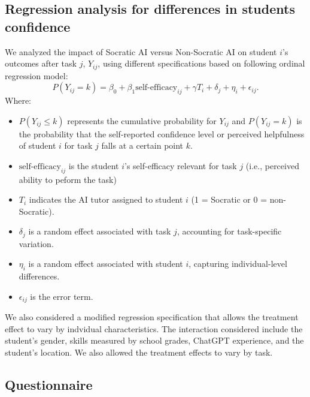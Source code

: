 \documentclass[
  11pt,
]{article}
\begin{document}
\subsection{Regression analysis for differences in students confidence}\label{sec:regress-confidence}

We analyzed the impact of Socratic AI versus Non-Socratic AI on student \(i\)'s outcomes after task \(j\), \(Y_{ij}\), using different specifications based on following ordinal regression model:
\[
  P(Y_{ij} = k) = 
    \beta_0 + \beta_1 \text{self-efficacy}_{ij} + \gamma T_{i} 
    + \delta_j + \eta_i + \epsilon_{ij}.
\]
Where:

\begin{itemize}
\item
  \(P(Y_{ij} \leq k)\) represents the cumulative probability for \(Y_{ij}\) and \(P(Y_{ij} = k)\) is the probability that the self-reported confidence level or perceived helpfulness of student \(i\) for task \(j\) falls at a certain point \(k\).
\item
  \(\text{self-efficacy}_{ij}\) is the student \(i\)'s self-efficacy relevant for task \(j\) (i.e., perceived ability to peform the task)
\item
  \(T_i\) indicates the AI tutor assigned to student \(i\) (1 = Socratic or 0 = non-Socratic).
\item
  \(\delta_j\) is a random effect associated with task \(j\), accounting for task-specific variation.
\item
  \(\eta_i\) is a random effect associated with student \(i\), capturing individual-level differences.
\item
  \(\epsilon_{ij}\) is the error term.
\end{itemize}

We also considered a modified regression specification that allows the treatment effect to vary by indvidual characteristics. The interaction considered include the student's gender, skills measured by school grades, ChatGPT experience, and the student's location. We also allowed the treatment effects to vary by task.

\newpage

\subsection{Questionnaire}\label{sec:questionnaire}
\end{document}
